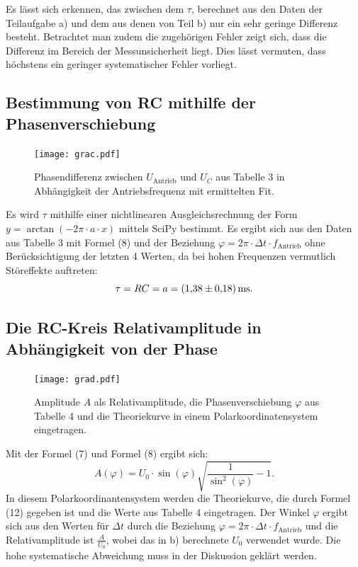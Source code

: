 Es lässt sich erkennen, das zwischen dem $\tau$, berechnet aus den Daten der
 Teilaufgabe a) und dem aus denen von Teil b) nur ein sehr geringe Differenz
  besteht. Betrachtet man zudem die zugehörigen Fehler zeigt sich, dass die
	Differenz im Bereich der Messunsicherheit liegt. Dies lässt vermuten, dass höchstens ein geringer systematischer Fehler vorliegt.

\subsection{Bestimmung von RC mithilfe der Phasenverschiebung}
	 \begin{figure}[H]
	 	\centering
	 	\caption{Phasendifferenz zwischen $U_{\text{Antrieb}}$ und $U_C$ aus Tabelle 3 in Abhängigkeit der Antriebsfrequenz mit ermittelten Fit.}
	 	\texttt{[image: grac.pdf]}
	 	\label{fig:grac}
	 \end{figure}
	 
	 Es wird $\tau$ mithilfe einer nichtlinearen Ausgleichsrechnung der Form $y = \arctan(-2\pi \cdot a \cdot x)$ mittels SciPy \cite{scipy} bestimmt. Es ergibt sich aus den Daten aus Tabelle 3 mit Formel (8) und der Beziehung $\varphi=2\pi \cdot \Delta t \cdot f_{\text{Antrieb}}$ ohne Berücksichtigung der letzten 4 Werten, da bei hohen Frequenzen vermutlich Störeffekte auftreten:
	 \begin{displaymath}
	 \tau = RC = a = \SI{1.38 \pm 0.18}{\milli\second}\text{.}
	 \end{displaymath}


	 \subsection{Die RC-Kreis Relativamplitude in Abhängigkeit von der Phase}

	 \begin{figure}[H]
	  \centering
	  \caption{Amplitude $A$ als Relativamplitude, die Phasenverschiebung $\varphi$ aus Tabelle 4 und die Theoriekurve in einem Polarkoordinatensystem eingetragen.}
	  \texttt{[image: grad.pdf]}
	  \label{fig:grad}
	 \end{figure}
	 
	 Mit der Formel (7) und Formel (8) ergibt sich:
	 \begin{equation}
	 A(\varphi) = U_0\cdot \sin(\varphi)\sqrt{\frac{1}{\sin^2(\varphi)}-1}\text{.}
	 \end{equation}
	 In diesem Polarkoordinantensystem werden die Theoriekurve, die durch Formel (12) gegeben ist und die Werte aus Tabelle 4 eingetragen. Der Winkel $\varphi$ ergibt sich aus den Werten für $\Delta t$ durch die Beziehung $\varphi=2\pi \cdot \Delta t \cdot f_{\text{Antrieb}}$ und die Relativamplitude ist $\frac{A}{U_{0}}$, wobei das in b) berechnete $U_{0}$ verwendet wurde. Die hohe systematische Abweichung muss in der Diskussion geklärt werden.



